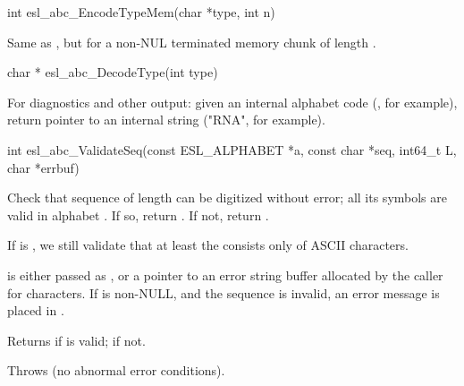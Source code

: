 \begin{sreapi}
\hypertarget{func:esl_abc_EncodeTypeMem()}
{\item[int esl\_abc\_EncodeTypeMem(char *type, int n)]}

Same as , but for a
non-NUL terminated memory chunk  of
length .


\hypertarget{func:esl_abc_DecodeType()}
{\item[char * esl\_abc\_DecodeType(int type)]}

For diagnostics and other output: given an internal
alphabet code  (, for example), return
pointer to an internal string ("RNA", for example). 


\hypertarget{func:esl_abc_ValidateSeq()}
{\item[int esl\_abc\_ValidateSeq(const ESL\_ALPHABET *a, const char *seq, int64\_t L, char *errbuf)]}

Check that sequence  of length  can be digitized
without error; all its symbols are valid in alphabet
. If so, return . If not, return .

If  is , we still validate that at least the
 consists only of ASCII characters.

 is either passed as , or a pointer to an
error string buffer allocated by the caller for
 characters. If  is non-NULL, and
the sequence is invalid, an error message is placed in
.

Returns  if  is valid;  if not.

Throws (no abnormal error conditions).


\end{sreapi}

